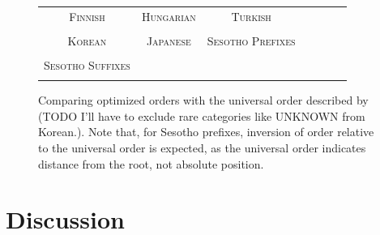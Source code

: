 \documentclass[11pt,letterpaper]{article}
\newcommand\mhahn[1]{{\color{red}(#1)}}
\begin{document}
\begin{figure}
\begin{tabular}{ccccccc}
\textsc{Finnish} & \textsc{Hungarian} & \textsc{Turkish} \\
\begin{minipage}{.3\textwidth}
  
    \end{minipage}
    &
    \begin{minipage}{.3\textwidth}
  
    \end{minipage}
        &
    \begin{minipage}{.3\textwidth}
  
    \end{minipage} 
    \\
    \textsc{Korean} & \textsc{Japanese} & \textsc{Sesotho Prefixes} \\
        \begin{minipage}{.3\textwidth}
  
    \end{minipage}
    &
    \begin{minipage}{.3\textwidth}
  
    \end{minipage}
        &
    \begin{minipage}{.3\textwidth}
  
    \end{minipage}
    \\
    \textsc{Sesotho Suffixes} \\
        \begin{minipage}{.3\textwidth}
  
    \end{minipage}
\end{tabular}
    \caption{Comparing optimized orders with the universal order described by \citep{bybee-morphology-1985} \mhahn{TODO I'll have to exclude rare categories like UNKNOWN from Korean.}. Note that, for Sesotho prefixes, inversion of order relative to the universal order is expected, as the universal order indicates distance from the root, not absolute position.}
    \label{fig:my_label}
\end{figure}


\section{Discussion}
\end{document}
